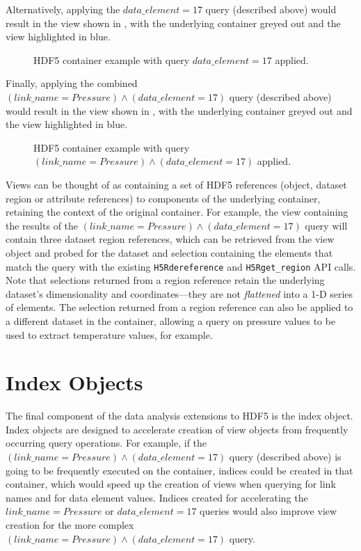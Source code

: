\documentclass[letterpaper,hyper]{THG_RFC}
\begin{document}
Alternatively, applying the $data\_element = 17$ query (described above) would
result in the view shown in , with the
underlying container greyed out and the view highlighted in blue.

\begin{figure}

\caption{HDF5 container example with query $data\_element = 17$ applied.}
\label{fig:hdf5_view3}
\end{figure}

Finally, applying the combined $(link\_name = Pressure)\land(data\_element = 17)$
query (described above) would result in the view shown in
, with the underlying container
greyed out and the view highlighted in blue.

\begin{figure}

\caption{HDF5 container example with query $(link\_name = Pressure)\land(data\_element = 17)$ applied.}
\label{fig:hdf5_view4}
\end{figure}

Views can be thought of as containing a set of HDF5 references (object,
dataset region or attribute references) to components of the underlying
container, retaining the context of the original container. For example, the
view containing the results of the $(link\_name = Pressure)\land(data\_element = 17)$
query will contain three dataset region references, which
can be retrieved from the view object and probed for the dataset and selection
containing the elements that match the query with the existing \texttt{H5Rdereference}
and \texttt{H5Rget\_region} API calls. Note that selections returned from a region
reference retain the underlying dataset's dimensionality and coordinates---they
are not \textit{flattened} into a 1-D series of elements. The selection returned
from a region reference can also be applied to a different dataset in the container,
allowing a query on pressure values to be used to extract temperature values,
for example.

\section{Index Objects}
The final component of the data analysis extensions to HDF5 is the index object.
Index objects are designed to accelerate creation of view objects from
frequently occurring query operations.
For example, if the $(link\_name = Pressure)\land(data\_element = 17)$ query
(described above) is going to be frequently executed on the container, indices
could be created in that container, which would speed up the creation of views
when querying for link names and for data element values. Indices created for
accelerating the $link\_name = Pressure$ or $data\_element = 17$ queries
would also improve view creation for the more complex
$(link\_name = Pressure)\land(data\_element = 17)$ query.
\end{document}
